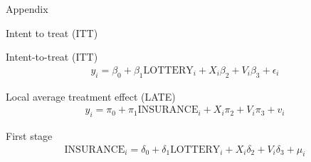 \documentclass[12pt,notes=hide,aspectratio=169,mathserif]{beamer}
\begin{document}
\appendix
{}
\begin{frame}[plain] \begin{center}{\LARGE Appendix}\end{center} \end{frame}
\begin{frame}{Intent to treat (ITT)}
  \hypertarget{ohie:ITT}{}
  
  Intent-to-treat (ITT)
  \vspace{-3mm}
  \begin{align*}
      y_{i} = \beta_0 + \beta_1 \text{LOTTERY}_i + X_{i} \beta_2 + V_{i} \beta_3 + \epsilon_{i}
  \end{align*}

  Local average treatment effect (LATE)
  \vspace{-3mm}
  \begin{align*}
      y_{i} = \pi_0 + \pi_1 \text{INSURANCE}_i + X_{i} \pi_2 + V_{i} \pi_3 + v_{i}
  \end{align*}
  
  First stage
  \vspace{-3mm}
  \begin{align*}
      \text{INSURANCE}_{i} = \delta_0 + \delta_1 \text{LOTTERY}_i + X_{i} \delta_2 + V_{i} \delta_3 + \mu_{i}
  \end{align*}
    \vspace{-5mm}
    \hyperlink{ohie:table}{}
\end{frame}
\end{document}
